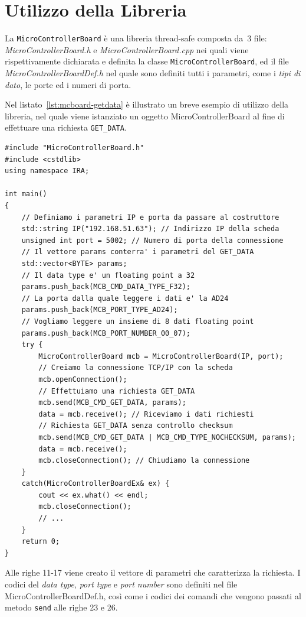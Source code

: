 \section{Utilizzo della Libreria}
La \texttt{MicroControllerBoard} \`e una libreria thread-safe composta da~3 file: 
\emph{MicroControllerBoard.h} e \emph{MicroControllerBoard.cpp} nei quali viene rispettivamente
dichiarata e definita la classe \texttt{MicroControllerBoard}, ed il file \emph{MicroControllerBoardDef.h}
nel quale sono definiti tutti i parametri, come i \emph{tipi di dato}, le porte ed i numeri di porta.

Nel listato~\ref{lst:mcboard-getdata} \`e illustrato un breve esempio di utilizzo della
libreria, nel quale viene istanziato un oggetto MicroControllerBoard al fine di 
effettuare una richiesta \texttt{GET\_DATA}.
\lstset{language=C++}
\begin{lstlisting}[caption={[Esempio di utilizzo della libreria \texttt{MicroControllerBoard}]Esempio 
di utilizzo della libreria \texttt{MicroControllerBoard}},
label=lst:mcboard-getdata,mathescape]
#include "MicroControllerBoard.h"
#include <cstdlib>
using namespace IRA;

int main()
{
    // Definiamo i parametri IP e porta da passare al costruttore
    std::string IP("192.168.51.63"); // Indirizzo IP della scheda
    unsigned int port = 5002; // Numero di porta della connessione
    // Il vettore params conterra' i parametri del GET_DATA
    std::vector<BYTE> params;
    // Il data type e' un floating point a 32
    params.push_back(MCB_CMD_DATA_TYPE_F32);
    // La porta dalla quale leggere i dati e' la AD24
    params.push_back(MCB_PORT_TYPE_AD24); 
    // Vogliamo leggere un insieme di 8 dati floating point
    params.push_back(MCB_PORT_NUMBER_00_07);
    try {
        MicroControllerBoard mcb = MicroControllerBoard(IP, port);
        // Creiamo la connessione TCP/IP con la scheda
        mcb.openConnection();
        // Effettuiamo una richiesta GET_DATA
        mcb.send(MCB_CMD_GET_DATA, params);
        data = mcb.receive(); // Riceviamo i dati richiesti
        // Richiesta GET_DATA senza controllo checksum
        mcb.send(MCB_CMD_GET_DATA | MCB_CMD_TYPE_NOCHECKSUM, params);
        data = mcb.receive();
        mcb.closeConnection(); // Chiudiamo la connessione
    }
    catch(MicroControllerBoardEx& ex) {
        cout << ex.what() << endl;
        mcb.closeConnection();
        // ...
    }
    return 0;
}
\end{lstlisting}
\lstset{numbers=none}
Alle righe 11-17 viene creato il vettore di parametri che caratterizza la richiesta. I codici del
\textit{data type}, \textit{port type} e \textit{port number} sono definiti nel file
MicroControllerBoardDef.h, cos\`i come i codici dei comandi che vengono passati al metodo
\texttt{send} alle righe 23 e 26.

